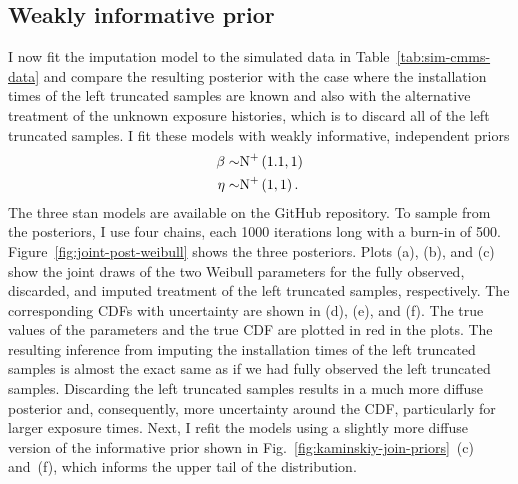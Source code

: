 

\subsection{Weakly informative prior} \label{subsec:weibull-model-fits}

I now fit the imputation model to the simulated data in Table~\ref{tab:sim-cmms-data} and compare the resulting posterior with the case where the installation times of the left truncated samples are known and also with the alternative treatment of the unknown exposure histories, which is to discard all of the left truncated samples. I fit these models with weakly informative, independent priors
\begin{align*}
    \beta \sim & \hbox{N}^{+}\left(1.1, 1\right)  \\
    \eta \sim & \hbox{N}^{+}\left(1, 1\right).
\end{align*}
The three stan models are available on the GitHub repository. To sample from the posteriors, I use four chains, each 1000 iterations long with a burn-in of 500. Figure~\ref{fig:joint-post-weibull} shows the three posteriors. Plots (a), (b), and (c) show the joint draws of the two Weibull parameters for the fully observed, discarded, and imputed treatment of the left truncated samples, respectively. The corresponding CDFs with uncertainty are shown in (d), (e), and (f). The true values of the parameters and the true CDF are plotted in red in the plots. The resulting inference from imputing the installation times of the left truncated samples is almost the exact same as if we had fully observed the left truncated samples. Discarding the left truncated samples results in a much more diffuse posterior and, consequently, more uncertainty around the CDF, particularly for larger exposure times. Next, I refit the models using a slightly more diffuse version of the informative prior shown in Fig.~\ref{fig:kaminskiy-join-priors}~(c) and~(f), which informs the upper tail of the distribution.

